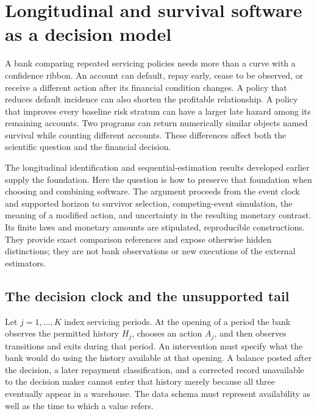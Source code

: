 \chapter{Longitudinal and survival software as a decision model}
\label{exec17:s5}

A bank comparing repeated servicing policies needs more than a curve with a
confidence ribbon. An account can default, repay early, cease to be observed,
or receive a different action after its financial condition changes. A policy
that reduces default incidence can also shorten the profitable relationship.
A policy that improves every baseline risk stratum can have a larger late
hazard among its remaining accounts. Two programs can return numerically
similar objects named survival while counting different accounts. These
differences affect both the scientific question and the financial decision.

The longitudinal identification and sequential-estimation results developed
earlier supply the foundation. Here the question is how to preserve that
foundation when choosing and combining software. The argument proceeds from
the event clock and supported horizon to survivor selection, competing-event
simulation, the meaning of a modified action, and uncertainty in the resulting
monetary contrast. Its finite laws and monetary amounts are stipulated,
reproducible constructions. They provide exact comparison references and
expose otherwise hidden distinctions; they are not bank observations or new
executions of the external estimators.~\citep{exec17_s5_math}

\section{The decision clock and the unsupported tail}
\label{exec17:s5-horizon}

Let $j=1,\ldots,K$ index servicing periods. At the opening of a period the
bank observes the permitted history $H_j$, chooses an action $A_j$, and then
observes transitions and exits during that period. An intervention must specify
what the bank would do using the history available at that opening. A balance
posted after the decision, a later repayment classification, and a corrected
record unavailable to the decision maker cannot enter that history merely
because all three eventually appear in a warehouse. The data schema must
represent availability as well as the time to which a value refers.

